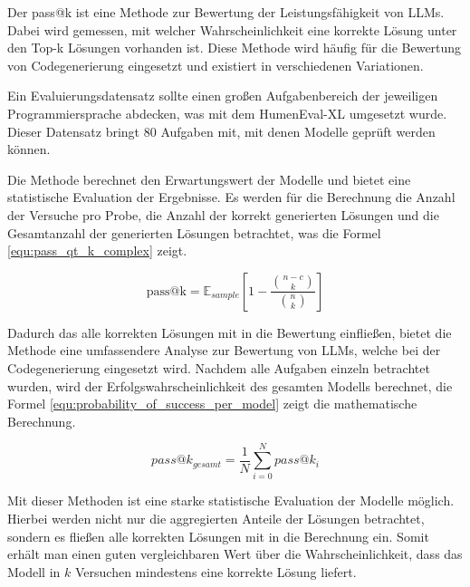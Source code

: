 Der pass@k ist eine Methode zur Bewertung der Leistungsfähigkeit von LLMs. Dabei wird gemessen, mit welcher Wahrscheinlichkeit eine korrekte Lösung unter den Top-k Lösungen vorhanden ist. Diese Methode wird häufig für die Bewertung von Codegenerierung eingesetzt und existiert in verschiedenen Variationen.\vspace{0.2cm}

Ein Evaluierungsdatensatz sollte einen großen Aufgabenbereich der jeweiligen Programmiersprache abdecken, was mit dem HumenEval-XL umgesetzt wurde. Dieser Datensatz bringt 80 Aufgaben mit, mit denen Modelle geprüft werden können.\vspace{0.2cm}

Die Methode berechnet den Erwartungswert der Modelle und bietet eine statistische Evaluation der Ergebnisse. Es werden für die Berechnung die Anzahl der Versuche pro Probe, die Anzahl der korrekt generierten Lösungen und die Gesamtanzahl der generierten Lösungen betrachtet, was die Formel \ref{equ:pass_qt_k_complex} zeigt.\vspace{0.2cm}

\begin{equation}\label{equ:pass_qt_k_complex}
	\text{pass@k} = \mathbb{E}_{sample} \left[ 1 - \frac{\binom{n-c}{k}}{\binom{n}{k}}\right]
\end{equation}

Dadurch das alle korrekten Lösungen mit in die Bewertung einfließen, bietet die Methode eine umfassendere Analyse zur Bewertung von LLMs, welche bei der Codegenerierung eingesetzt wird. Nachdem alle Aufgaben einzeln betrachtet wurden, wird der Erfolgswahrscheinlichkeit des gesamten Modells berechnet, die Formel \ref{equ:probability_of_success_per_model} zeigt die mathematische Berechnung.

\begin{equation}\label{equ:probability_of_success_per_model}
	pass@k_{gesamt} = \frac{1}{N} \sum_{i=0}^{N} pass@k_{i}
\end{equation}

Mit dieser Methoden ist eine starke statistische Evaluation der Modelle möglich. Hierbei werden nicht nur die aggregierten Anteile der Lösungen betrachtet, sondern es fließen alle korrekten Lösungen mit in die Berechnung ein. Somit erhält man einen guten vergleichbaren Wert über die Wahrscheinlichkeit, dass das Modell in $k$ Versuchen mindestens eine korrekte Lösung liefert.

